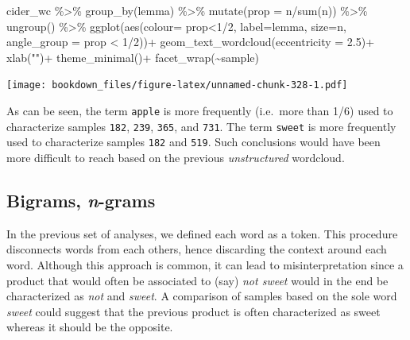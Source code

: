 \documentclass[
]{krantz}
\makeatletter
\newenvironment{Shaded}{\begin{snugshade}}{\end{snugshade}}
\newcommand{\AttributeTok}[1]{\textcolor[rgb]{0.61,0.61,0.61}{#1}}
\newcommand{\DecValTok}[1]{\textcolor[rgb]{0.06,0.06,0.06}{#1}}
\newcommand{\FloatTok}[1]{\textcolor[rgb]{0.06,0.06,0.06}{#1}}
\newcommand{\FunctionTok}[1]{\textcolor[rgb]{0,0,0}{#1}}
\newcommand{\NormalTok}[1]{#1}
\newcommand{\SpecialCharTok}[1]{\textcolor[rgb]{0,0,0}{#1}}
\newcommand{\StringTok}[1]{\textcolor[rgb]{0.5,0.5,0.5}{#1}}
\newenvironment{kframe}{%
\medskip{}
\setlength{\fboxsep}{.8em}
 \def\at@end@of@kframe{}%
 \ifinner\ifhmode%
  \def\at@end@of@kframe{\end{minipage}}%
  \begin{minipage}{\columnwidth}%
 \fi\fi%
 \def\FrameCommand##1{\hskip\@totalleftmargin \hskip-\fboxsep
 \colorbox{shadecolor}{##1}\hskip-\fboxsep
     \hskip-\linewidth \hskip-\@totalleftmargin \hskip\columnwidth}%
 \MakeFramed {\advance\hsize-\width
   \@totalleftmargin\z@ \linewidth\hsize
   \@setminipage}}%
 {\par\unskip\endMakeFramed%
 \at@end@of@kframe}
\renewenvironment{Shaded}{\begin{kframe}}{\end{kframe}}
\makeatother
\begin{document}
\begin{Shaded}
\begin{Highlighting}[]
\NormalTok{cider\_wc }\SpecialCharTok{\%\textgreater{}\%} 
  \FunctionTok{group\_by}\NormalTok{(lemma) }\SpecialCharTok{\%\textgreater{}\%} 
  \FunctionTok{mutate}\NormalTok{(}\AttributeTok{prop =}\NormalTok{ n}\SpecialCharTok{/}\FunctionTok{sum}\NormalTok{(n)) }\SpecialCharTok{\%\textgreater{}\%} 
  \FunctionTok{ungroup}\NormalTok{() }\SpecialCharTok{\%\textgreater{}\%} 
  \FunctionTok{ggplot}\NormalTok{(}\FunctionTok{aes}\NormalTok{(}\AttributeTok{colour=}\NormalTok{ prop}\SpecialCharTok{\textless{}}\DecValTok{1}\SpecialCharTok{/}\DecValTok{2}\NormalTok{, }\AttributeTok{label=}\NormalTok{lemma, }\AttributeTok{size=}\NormalTok{n, }\AttributeTok{angle\_group =}\NormalTok{ prop }\SpecialCharTok{\textless{}} \DecValTok{1}\SpecialCharTok{/}\DecValTok{2}\NormalTok{))}\SpecialCharTok{+}
  \FunctionTok{geom\_text\_wordcloud}\NormalTok{(}\AttributeTok{eccentricity =} \FloatTok{2.5}\NormalTok{)}\SpecialCharTok{+}
  \FunctionTok{xlab}\NormalTok{(}\StringTok{""}\NormalTok{)}\SpecialCharTok{+}
  \FunctionTok{theme\_minimal}\NormalTok{()}\SpecialCharTok{+}
  \FunctionTok{facet\_wrap}\NormalTok{(}\SpecialCharTok{\textasciitilde{}}\NormalTok{sample)}
\end{Highlighting}
\end{Shaded}

\texttt{[image: bookdown\_files/figure-latex/unnamed-chunk-328-1.pdf]}

As can be seen, the term \texttt{apple} is more frequently (i.e.~more than 1/6) used to characterize samples \texttt{182}, \texttt{239}, \texttt{365}, and \texttt{731}. The term \texttt{sweet} is more frequently used to characterize samples \texttt{182} and \texttt{519}. Such conclusions would have been more difficult to reach based on the previous \emph{unstructured} wordcloud.

\hypertarget{bigrams-n-grams}{%
\subsection{\texorpdfstring{Bigrams, \emph{n}-grams}{Bigrams, n-grams}}\label{bigrams-n-grams}}

In the previous set of analyses, we defined each word as a token. This procedure disconnects words from each others, hence discarding the context around each word. Although this approach is common, it can lead to misinterpretation since a product that would often be associated to (say) \emph{not sweet} would in the end be characterized as \emph{not} and \emph{sweet}. A comparison of samples based on the sole word \emph{sweet} could suggest that the previous product is often characterized as sweet whereas it should be the opposite.
\end{document}
